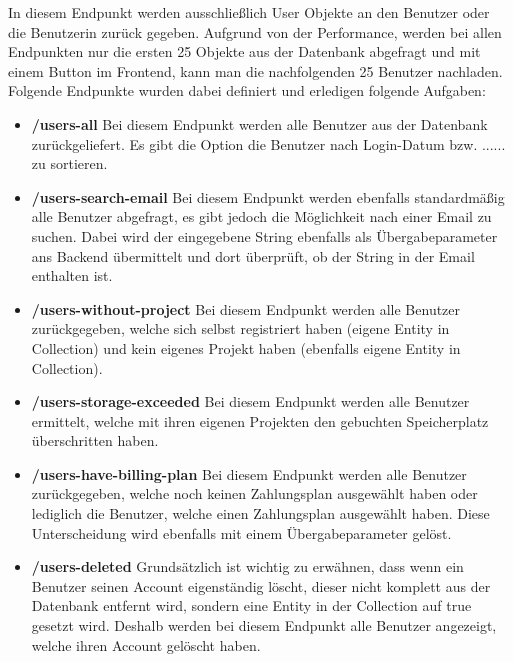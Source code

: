 In diesem Endpunkt werden ausschließlich User Objekte an den Benutzer oder die Benutzerin zurück gegeben. Aufgrund von der Performance, werden bei allen Endpunkten nur die ersten 25 Objekte aus der Datenbank abgefragt und mit einem Button im Frontend, kann man die nachfolgenden 25 Benutzer nachladen. Folgende Endpunkte wurden dabei definiert und erledigen folgende Aufgaben:
\begin{itemize}
    \item \textbf{/users-all}
        \newline
        Bei diesem Endpunkt werden alle Benutzer aus der Datenbank zurückgeliefert. Es gibt die Option die Benutzer nach Login-Datum bzw. ...... zu sortieren.
    \item \textbf{/users-search-email}
        \newline
        Bei diesem Endpunkt werden ebenfalls standardmäßig alle Benutzer abgefragt, es gibt jedoch die Möglichkeit nach einer Email zu suchen. Dabei wird der eingegebene String ebenfalls als Übergabeparameter ans Backend übermittelt und dort überprüft, ob der String in der Email enthalten ist.
    \item \textbf{/users-without-project}
        \newline
        Bei diesem Endpunkt werden alle Benutzer zurückgegeben, welche sich selbst registriert haben (eigene Entity in Collection) und kein eigenes Projekt haben (ebenfalls eigene Entity in Collection).
    \item \textbf{/users-storage-exceeded}
        \newline
        Bei diesem Endpunkt werden alle Benutzer ermittelt, welche mit ihren eigenen Projekten den gebuchten Speicherplatz überschritten haben.
    \item \textbf{/users-have-billing-plan}
        \newline
        Bei diesem Endpunkt werden alle Benutzer zurückgegeben, welche noch keinen Zahlungsplan ausgewählt haben oder lediglich die Benutzer, welche einen Zahlungsplan ausgewählt haben. Diese Unterscheidung wird ebenfalls mit einem Übergabeparameter gelöst.
    \item \textbf{/users-deleted}
        \newline
        Grundsätzlich ist wichtig zu erwähnen, dass wenn ein Benutzer seinen Account eigenständig löscht, dieser nicht komplett aus der Datenbank entfernt wird, sondern eine Entity in der Collection auf true gesetzt wird. Deshalb werden bei diesem Endpunkt alle Benutzer angezeigt, welche ihren Account gelöscht haben.

\end{itemize}

